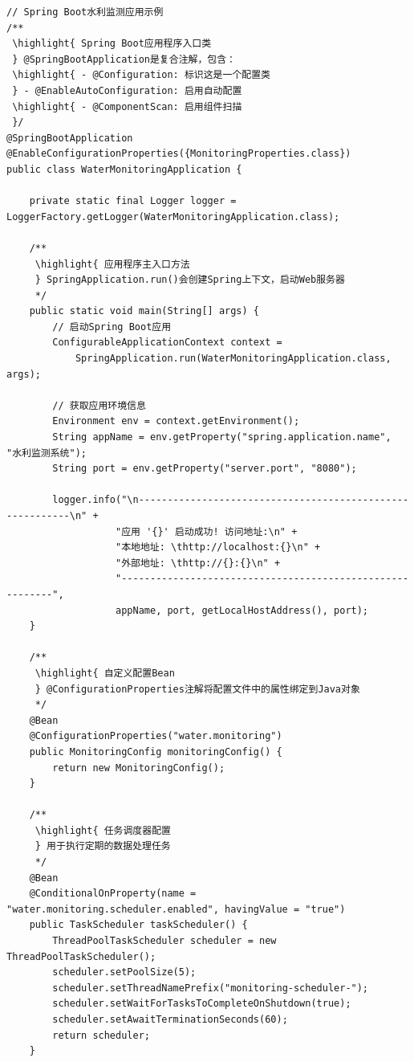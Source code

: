 \begin{lstlisting}[style=java]
// Spring Boot水利监测应用示例
/**
 \highlight{ Spring Boot应用程序入口类
 } @SpringBootApplication是复合注解，包含：
 \highlight{ - @Configuration: 标识这是一个配置类
 } - @EnableAutoConfiguration: 启用自动配置
 \highlight{ - @ComponentScan: 启用组件扫描
 }/
@SpringBootApplication
@EnableConfigurationProperties({MonitoringProperties.class})
public class WaterMonitoringApplication {
    
    private static final Logger logger = LoggerFactory.getLogger(WaterMonitoringApplication.class);
    
    /**
     \highlight{ 应用程序主入口方法
     } SpringApplication.run()会创建Spring上下文，启动Web服务器
     */
    public static void main(String[] args) {
        // 启动Spring Boot应用
        ConfigurableApplicationContext context = 
            SpringApplication.run(WaterMonitoringApplication.class, args);
        
        // 获取应用环境信息
        Environment env = context.getEnvironment();
        String appName = env.getProperty("spring.application.name", "水利监测系统");
        String port = env.getProperty("server.port", "8080");
        
        logger.info("\n----------------------------------------------------------\n" +
                   "应用 '{}' 启动成功! 访问地址:\n" +
                   "本地地址: \thttp://localhost:{}\n" +
                   "外部地址: \thttp://{}:{}\n" +
                   "----------------------------------------------------------",
                   appName, port, getLocalHostAddress(), port);
    }
    
    /**
     \highlight{ 自定义配置Bean
     } @ConfigurationProperties注解将配置文件中的属性绑定到Java对象
     */
    @Bean
    @ConfigurationProperties("water.monitoring")
    public MonitoringConfig monitoringConfig() {
        return new MonitoringConfig();
    }
    
    /**
     \highlight{ 任务调度器配置
     } 用于执行定期的数据处理任务
     */
    @Bean
    @ConditionalOnProperty(name = "water.monitoring.scheduler.enabled", havingValue = "true")
    public TaskScheduler taskScheduler() {
        ThreadPoolTaskScheduler scheduler = new ThreadPoolTaskScheduler();
        scheduler.setPoolSize(5);
        scheduler.setThreadNamePrefix("monitoring-scheduler-");
        scheduler.setWaitForTasksToCompleteOnShutdown(true);
        scheduler.setAwaitTerminationSeconds(60);
        return scheduler;
    }
    

\end{lstlisting}
